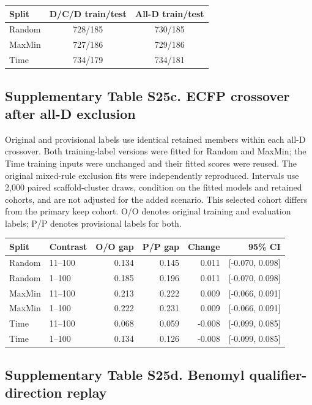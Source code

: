 \begin{center}
\small
\begin{tabular}{lcc}
\toprule
Split & D/C/D train/test & All-D train/test \\
\midrule
Random & 728/185 & 730/185 \\
MaxMin & 727/186 & 729/186 \\
Time & 734/179 & 734/181 \\
\bottomrule
\end{tabular}
\end{center}

\subsection*{Supplementary Table S25c. ECFP crossover after all-D exclusion}

Original and provisional labels use identical retained members within
each all-D crossover. Both training-label versions were fitted for Random and
MaxMin; the Time training inputs were unchanged and their fitted scores were
reused. The original mixed-rule exclusion fits were independently reproduced.
Intervals use 2,000 paired scaffold-cluster draws, condition on the fitted models
and retained cohorts, and are not adjusted for the added scenario. This selected
cohort differs from the primary keep cohort. O/O denotes original training and
evaluation labels; P/P denotes provisional labels for both.

\begin{center}
\small
\begin{tabular}{llrrrr}
\toprule
Split & Contrast & O/O gap & P/P gap & Change & 95\% CI \\
\midrule
Random & 11--100 & 0.134 & 0.145 & 0.011 & [-0.070, 0.098] \\
Random & 1--100 & 0.185 & 0.196 & 0.011 & [-0.070, 0.098] \\
MaxMin & 11--100 & 0.213 & 0.222 & 0.009 & [-0.066, 0.091] \\
MaxMin & 1--100 & 0.222 & 0.231 & 0.009 & [-0.066, 0.091] \\
Time & 11--100 & 0.068 & 0.059 & -0.008 & [-0.099, 0.085] \\
Time & 1--100 & 0.134 & 0.126 & -0.008 & [-0.099, 0.085] \\
\bottomrule
\end{tabular}
\end{center}


\subsection*{Supplementary Table S25d. Benomyl qualifier-direction replay}

